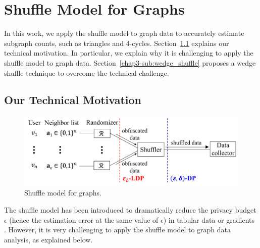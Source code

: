 \section{Shuffle Model for Graphs}
\label{chap3-sec:shuffle}
In this work, we apply the shuffle model to graph data to accurately estimate subgraph counts, such as triangles and 4-cycles. 
Section~\ref{chap3-sub:technical} explains our technical motivation. 
In particular, we explain why it is challenging to apply the shuffle model to graph data. 
Section~\ref{chap3-sub:wedge_shuffle} proposes a wedge shuffle technique to overcome the technical challenge. 

\subsection{Our Technical Motivation}
\label{chap3-sub:technical}

\begin{figure}[t]
  \centering
  \includegraphics[width=0.99\linewidth]{fig/shuffle.pdf}
  \vspace{-2mm}
  \caption{Shuffle model for graphs. 
  }
  \label{chap3-fig:shuffle_model}
\end{figure}

The shuffle model has been introduced to dramatically reduce the privacy budget $\epsilon$ (hence the estimation error at the same value of $\epsilon$) in tabular data \cite{Wang_PVLDB20} or 
gradients 
\cite{Girgis_AISTATS21,Liu_AAAI21}. 
However, it is very challenging to apply the shuffle model to graph data analysis, as explained below. 

